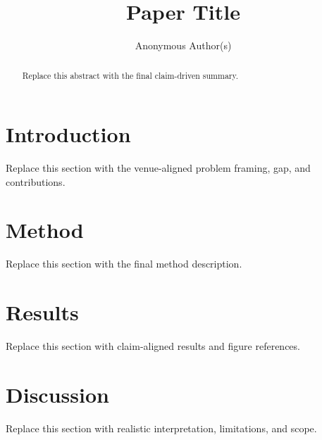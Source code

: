 \documentclass[twocolumn,10pt]{article}
\title{Paper Title}
\author{Anonymous Author(s)}
\date{}
\begin{document}
\maketitle

\begin{abstract}
Replace this abstract with the final claim-driven summary.
\end{abstract}

\section{Introduction}
Replace this section with the venue-aligned problem framing, gap, and contributions.

\section{Method}
Replace this section with the final method description.

\section{Results}
Replace this section with claim-aligned results and figure references.

\section{Discussion}
Replace this section with realistic interpretation, limitations, and scope.



\end{document}
